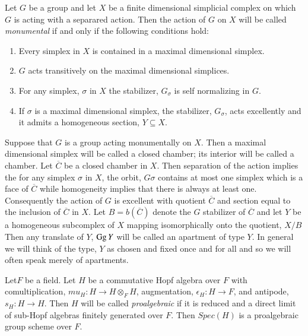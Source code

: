 \begin{definition}\label{chap6-definition-11.1}
Let $G$ be a group and let $X$ be a finite dimensional simplicial complex on  which $G$ is acting with a separared action. Then the action of $G$ on $X$ will be called \textit{monumental} if and only if the following conditions hold:
\begin{enumerate}[\rm (1)]
\item Every simplex in $X$ is contained in a maximal dimensional simplex.\label{chap6-}\label{chap6-definition11.1-enum-1}
\item $G$ acts transitively on the maximal dimensional simplices.\label{chap6-definition11.1-enum-2}
\item For any simplex, $\sigma$ in $X$ the stabilizer, $G_{\sigma}$ is self normalizing in $G$.\label{chap6-definition11.1-enum-3}
\item If $\sigma$ is a maximal dimensional simplex, the stabilizer, $G_{\sigma}$, acts excellently and it admits a homogeneous section, $Y \subseteq X$.\label{chap6-definition11.1-enum-4}
\end{enumerate}
\end{definition}

Suppose that $G$ is a group acting monumentally on $X$. Then a maximal dimensional simplex will be called a closed chamber; its interior will be called a chamber. Let $\overline{C}$ be a closed chamber in $X$. Then separation of the action implies the for any simplex $\sigma$ in $X$, the orbit, $G\sigma$ contains at most one simplex which is a face of $\overline{C}$ while homogeneity implies that there is always at least one. Consequently the action of $G$ is excellent with quotient $\overline{C}$ and section equal to the inclusion of $\overline{C}$ in $X$. Let $B = b(\overline{C})$ denote the $G$ stabilizer of $\overline{C}$ and let $Y$ be a homogeneous subcomplex of $X$ mapping isomorphically onto the quotient, $X/B$ Then any translate of $Y$, $\operatorname{Gg} Y$ will be called an apartment of type $Y$. In general we will think of the type, $Y$ as chosen and fixed once and for all and so we will often speak merely of apartments.  

Let\pageoriginale $F$ be a field. Let $H$ be a commutative Hopf algebra over $F$ with comultiplication, $mu_{H} : H \rightarrow H \otimes_{F} H$, augmentation, $\epsilon_{H} : H \rightarrow F$, and antipode, $s_{H} : H \rightarrow H$. Then $H$ will be called \textit{proalgebraic} if it is reduced and a direct limit of sub-Hopf algebras finitely generated over $F$. Then $Spec(H)$ is a proalgebraic group scheme over $F$.

